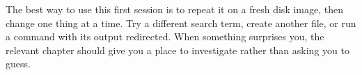 The best way to use this first session is to repeat it on a fresh disk image, then change one thing at a time. Try a different search term, create another file, or run a command with its output redirected. When something surprises you, the relevant chapter should give you a place to investigate rather than asking you to guess.
